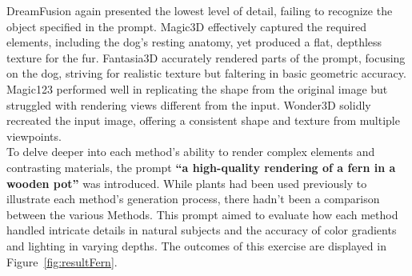 DreamFusion again presented the lowest level of detail, failing to recognize the object specified in the prompt. Magic3D effectively captured the required elements, including the dog's resting anatomy, yet produced a flat, depthless texture for the fur. Fantasia3D accurately rendered parts of the prompt, focusing on the dog, striving for realistic texture but faltering in basic geometric accuracy. Magic123 performed well in replicating the shape from the original image but struggled with rendering views different from the input. Wonder3D solidly recreated the input image, offering a consistent shape and texture from multiple viewpoints.\\






To delve deeper into each method's ability to render complex elements and contrasting materials, the prompt \textbf{``a high-quality rendering of a fern in a wooden pot''} was introduced. While plants had been used previously to illustrate each method's generation process, there hadn't been a comparison between the various Methods. This prompt aimed to evaluate how each method handled intricate details in natural subjects and the accuracy of color gradients and lighting in varying depths. The outcomes of this exercise are displayed in Figure~\ref{fig:resultFern}.

